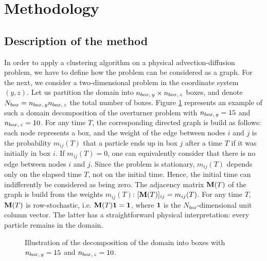 \section{Methodology}
\subsection{Description of the method}
In order to apply a clustering algorithm on a physical advection-diffusion problem, we have to define how the problem can be considered as a graph. For the next, we consider a two-dimensional problem in the coordinate system $(y,z)$. Let us partition the domain into $n_{box,\,y} \times n_{box,\,z}$ boxes, and denote $N_{box} = n_{box,\,y}n_{box,\,z}$ the total number of boxes. Figure \ref{fig:box_scheme} represents an example of such a domain decomposition of the overturner problem with $n_{box,\,y} = 15$ and $n_{box,\,z} = 10$. For any time $T$, the corresponding directed graph is build as follows: each node represents a box, and the weight of the edge between nodes $i$ and $j$ is the probability $m_{ij}(T)$ that a particle ends up in box $j$ after a time $T$ if it was initially in box $i$. If $m_{ij}(T) = 0$, one can equivalently consider that there is no edge between nodes $i$ and $j$. Since the problem is stationary, $m_{ij}(T)$ depends only on the elapsed time $T$, not on the initial time. Hence, the initial time can indifferently be considered as being zero. The adjacency matrix $\mathbf M(T)$ of the graph is build from the weights $m_{ij}(T)$: $[\mathbf M(T)]_{ij} = m_{ij}(T)$. For any time $T$, $\mathbf M(T)$ is row-stochastic, i.e. $\mathbf M(T)\mathbf 1 = \mathbf 1$, where $\mathbf 1$ is the $N_{box}$-dimensional unit column vector. The latter has a straightforward physical interpretation: every particle remains in the domain.

\begin{figure}[!htp]
	\centering
	
	\caption{Illustration of the decomposition of the domain into boxes with $n_{box,\,y} = 15$ and $n_{box,\,z} = 10$.}
	\label{fig:box_scheme}
\end{figure}

